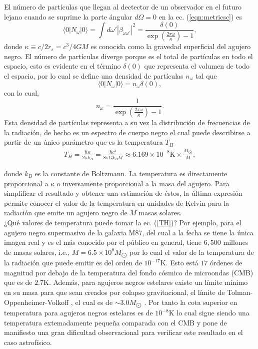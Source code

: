 El n\'{u}mero de part\'{i}culas que llegan al dectector de un observador en el futuro lejano cuando se suprime la parte \'{a}ngular $d\Omega=0$ en la ec. (\ref{eqn:metricsc}) es  
\begin{equation}
\langle 0|N_{\omega}|0\rangle=\int d\omega'|\beta_{\omega \omega'}|^2=\frac{\delta(0)}{\exp\left( \frac{2\pi\omega}{\kappa}\right)-1},
\end{equation}
donde $\kappa\equiv c/2r_s=c^3/4GM$ es conocida como la gravedad superficial del agujero negro. El número de partículas diverge porque es el total de partículas en todo el espacio, esto es evidente en el t\'{e}rmino $\delta(0)$ que representa el volumen de todo el espacio, por lo cual se define una densidad de partículas $n_{\omega}$ tal que
\begin{equation}
\langle 0|N_{\omega}|0\rangle=n_{\omega}\delta(0),
\end{equation}
con lo cual,
\begin{equation}\label{ec:flujo}
n_{\omega}=\frac{1}{\exp\left( \frac{2\pi\omega}{\kappa}\right)-1}.
\end{equation}
Esta densidad de part\'{i}culas representa a su vez la distribuci\'{o}n de frecuencias de la radiaci\'{o}n, de hecho es un espectro de cuerpo negro el cual puede describirse a partir de un \'{u}nico par\'{a}metro que es la temperatura $T_H$
 \begin{align}
 T_H=\frac{\hbar \kappa}{2\pi k_B}=\frac{\hbar c^3}{8\pi G k_B M}\approx 6.169 \times 10^{-8} \text{K}\times\frac{M_{\bigodot }}{M} ,
 \end{align}\label{TH}

donde $k_B$ es la constante de Boltzmann. La temperatura es directamente proporcional a $\kappa$ o inversamente proporcional a la masa del agujero. Para simplificar el resultado y obtener una estimaci\'{o}n de \'{e}stos, la \'{u}ltima expresi\'{o}n permite conocer el valor de la temperatura en unidades de Kelvin para la radiaci\'{o}n que emite un agujero negro de $M$ masas solares.\\

¿Qu\'{e} valores de temperatura puede tomar la ec. (\ref{TH})? Por ejemplo, para el agujero negro supermasivo de la galaxia M87, del cual a la fecha se tiene la \'{u}nica imagen real y es el m\'{a}s conocido por el p\'{u}blico en general, tiene $6,500$ millones de masas solares, i.e., $M=6.5\times 10^{8} M_{\bigodot}$ por lo cual el valor de la temperatura de la radiaci\'{o}n que puede emitir es del orden de $10^{-17}\text{K}$. Esto est\'{a} $17$ \'{o}rdenes de magnitud por debajo de la temperatura del fondo c\'{o}smico de microondas (CMB) que es de $2.7\text{K}$. Adem\'{a}s, para agujeros negros estelares existe un l\'{i}mite m\'{i}nimo en su masa para que sean creados por colapso gravitacional, el límite de Tolman-Oppenheimer-Volkoff \citep{bombaci1996maximum}, el cual es de $\sim 3.0 M_{\bigodot}$ . Por tanto la cota superior en temperatura para agujeros negros estelares es de $10^{-8}\text{K}$ lo cual sigue siendo una temperatura extemadamente peque\~{n}a comparada con el CMB y pone de manifiesto una gran dificultad observacional para verificar este resultado en el caso astrof\'{i}sico.\\

